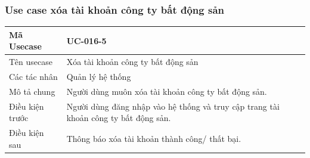 \documentclass[12pt,a4paper]{article}
\begin{document}
    \subsubsection*{Use case xóa tài khoản công ty bất động sản }
    \begin{table}[H]
        \centering
        \begin{tabular}{|p{3.5cm}|p{11.5cm}|c|}
            \hline
            Mã Usecase      & UC-016-5                                                                            \\
            \hline
            Tên usecase     & Xóa tài khoản công ty bất động sản                                                  \\
            \hline
            Các tác nhân    & Quản lý hệ thống                                                                    \\
            \hline
            Mô tả chung     & Người dùng muôn xóa tài khoản công ty bất động sản.                                 \\
            \hline

            Điều kiện trước & Người dùng đăng nhập vào hệ thống và truy cập trang tài khoản công ty bất động sản. \\
            \hline

            Điều kiện sau   & Thông báo xóa tài khoản thành công/ thất bại.                                       \\
            \hline


\end{tabular}
\end{table}
\end{document}
